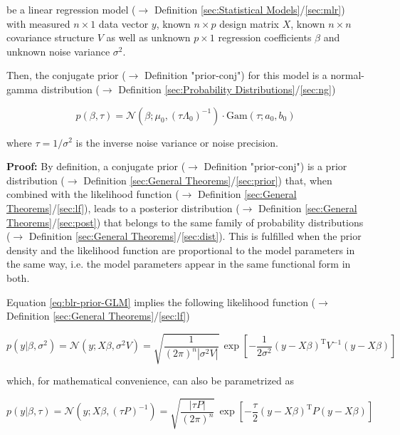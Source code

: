 \documentclass[a4paper,12pt,twoside]{book}
\begin{document}
be a linear regression model ($\rightarrow$ Definition \ref{sec:Statistical Models}/\ref{sec:mlr}) with measured $n \times 1$ data vector $y$, known $n \times p$ design matrix $X$, known $n \times n$ covariance structure $V$ as well as unknown $p \times 1$ regression coefficients $\beta$ and unknown noise variance $\sigma^2$.

Then, the conjugate prior ($\rightarrow$ Definition "prior-conj") for this model is a normal-gamma distribution ($\rightarrow$ Definition \ref{sec:Probability Distributions}/\ref{sec:ng})

\begin{equation} \label{eq:blr-prior-GLM-NG-prior}
p(\beta,\tau) = \mathcal{N}(\beta; \mu_0, (\tau \Lambda_0)^{-1}) \cdot \mathrm{Gam}(\tau; a_0, b_0)
\end{equation}

where $\tau = 1/\sigma^2$ is the inverse noise variance or noise precision.


\vspace{1em}
\textbf{Proof:} By definition, a conjugate prior ($\rightarrow$ Definition "prior-conj") is a prior distribution ($\rightarrow$ Definition \ref{sec:General Theorems}/\ref{sec:prior}) that, when combined with the likelihood function ($\rightarrow$ Definition \ref{sec:General Theorems}/\ref{sec:lf}), leads to a posterior distribution ($\rightarrow$ Definition \ref{sec:General Theorems}/\ref{sec:post}) that belongs to the same family of probability distributions ($\rightarrow$ Definition \ref{sec:General Theorems}/\ref{sec:dist}). This is fulfilled when the prior density and the likelihood function are proportional to the model parameters in the same way, i.e. the model parameters appear in the same functional form in both.

Equation \eqref{eq:blr-prior-GLM} implies the following likelihood function ($\rightarrow$ Definition \ref{sec:General Theorems}/\ref{sec:lf})

\begin{equation} \label{eq:blr-prior-GLM-LF-class}
p(y|\beta,\sigma^2) = \mathcal{N}(y; X \beta, \sigma^2 V) = \sqrt{\frac{1}{(2 \pi)^n |\sigma^2 V|}} \, \exp\left[ -\frac{1}{2 \sigma^2} (y-X\beta)^\mathrm{T} V^{-1} (y-X\beta) \right]
\end{equation}

which, for mathematical convenience, can also be parametrized as

\begin{equation} \label{eq:blr-prior-GLM-LF-Bayes}
p(y|\beta,\tau) = \mathcal{N}(y; X \beta, (\tau P)^{-1}) = \sqrt{\frac{|\tau P|}{(2 \pi)^n}} \, \exp\left[ -\frac{\tau}{2} (y-X\beta)^\mathrm{T} P (y-X\beta) \right]
\end{equation}
\end{document}
